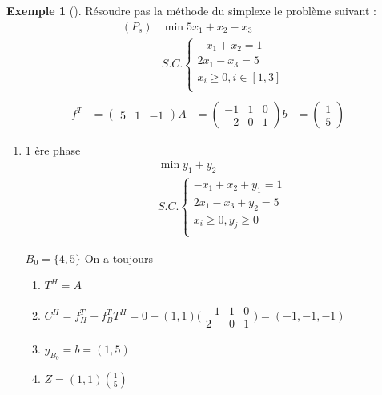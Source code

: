 \documentclass{article}
\theoremstyle{plain}%
\theoremstyle{definition}
\newtheorem{exmp}{Exemple}[section]
\theoremstyle{remark}
\begin{document}
\begin{exmp}[]
    Résoudre pas la méthode du simplexe le problème suivant : \begin{align*}
        (P_s) &\min 5x_1 + x_2 - x_3 \\
            &S.C. \begin{cases}
            -x_1 + x_2 = 1 & \\
            2x_1 - x_3 = 5 & \\
            x_i \geq 0, i \in [1,3] & \\
            \end{cases}  \\
    \end{align*}
    \begin{align*}
        f^T &= \begin{pmatrix}5 & 1 & -1\end{pmatrix}
        A &= \begin{pmatrix}-1 & 1 & 0 \\ -2&0&1\end{pmatrix}
        b &= \begin{pmatrix}1 \\ 5\end{pmatrix}
    \end{align*}

    \begin{enumerate}
        \item 1 ère phase 
        \begin{align*}
            &\min y_1 + y_2 \\
            &S.C. \begin{cases}
            -x_1 + x_2 + y_1 = 1 \\
            2x_1 - x_3 + y_2 = 5 \\
            x_i \geq 0, y_j \geq 0\\
            \end{cases}
        \end{align*}

        $ B_0 = \{4,5\} $ On a toujours \begin{enumerate}
            \item $ T^H = A$ 
            \item $ C^H = f_H^T - f_B^T T^H = 0 - (1,1) \big(\begin{smallmatrix}
                -1 & 1 & 0 \\
                2 & 0 & 1 
            \end{smallmatrix}\big) = (-1, -1, -1)$ 
            \item $ y_{B_0} =b = (1, 5) $
            \item $ Z = (1,1) \binom{1}{5} $ 
        \end{enumerate}


\end{enumerate}
\end{exmp}
\end{document}
